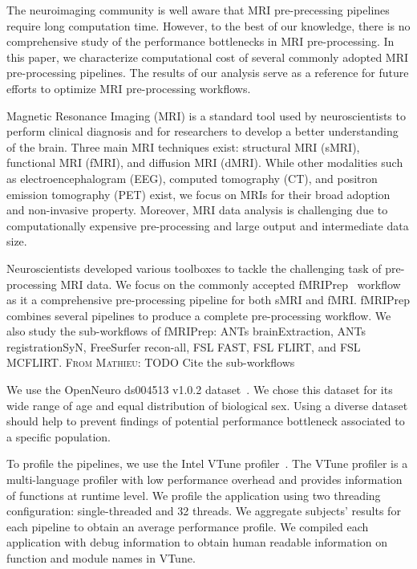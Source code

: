 \documentclass[conference]{IEEEtran}
\newcommand{\MD}[1]{\color{magenta}\textsc{From Mathieu: }#1\color{black}}
\begin{document}
The neuroimaging community is well aware that MRI pre-precessing pipelines require long computation time. However, to the best of our knowledge, there is no comprehensive study of the performance bottlenecks in MRI pre-processing. In this paper, we characterize computational cost of several commonly adopted MRI pre-processing pipelines. The results of our analysis serve as a reference for future efforts to optimize MRI pre-processing workflows.

Magnetic Resonance Imaging (MRI) is a standard tool used by neuroscientists to perform clinical diagnosis and for researchers to develop a better understanding of the brain. Three main MRI techniques exist: structural MRI (sMRI), functional MRI (fMRI), and diffusion MRI (dMRI). While other modalities such as electroencephalogram (EEG), computed tomography (CT), and positron emission tomography (PET) exist, we focus on MRIs for their broad adoption and non-invasive property. Moreover, MRI data analysis is challenging due to computationally expensive pre-processing and large output and intermediate data size.

Neuroscientists developed various toolboxes to tackle the challenging task of pre-processing MRI data. We focus on the commonly accepted fMRIPrep~\cite{Esteban2019-og} workflow as it a comprehensive pre-processing pipeline for both sMRI and fMRI. fMRIPrep combines several pipelines to produce a complete pre-processing workflow. We also study the sub-workflows of fMRIPrep: ANTs brainExtraction, ANTs registrationSyN, FreeSurfer recon-all, FSL FAST, FSL FLIRT, and FSL MCFLIRT.
\MD{TODO Cite the sub-workflows}

We use the OpenNeuro ds004513 v1.0.2 dataset~\cite{ds004513:1.0.2}. We chose this dataset for its wide range of age and equal distribution of biological sex. Using a diverse dataset should help to prevent findings of potential performance bottleneck associated to a specific population.

To profile the pipelines, we use the Intel VTune profiler~\cite{vtune_profiler}. The VTune profiler is a multi-language profiler with low performance overhead and provides information of functions at runtime level. We profile the application using two threading configuration: single-threaded and 32 threads. We aggregate subjects' results for each pipeline to obtain an average performance profile. We compiled each application with debug information to obtain human readable information on function and module names in VTune.
\end{document}
